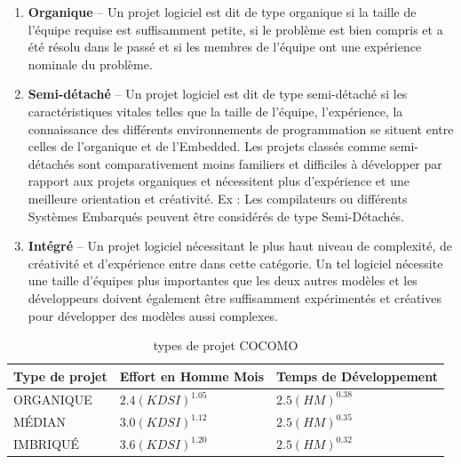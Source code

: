 \begin{enumerate}
	      \begin{enumerate}
		      \item \textbf{Organique} – Un projet logiciel est dit de type organique si la taille de l’équipe requise est suffisamment petite, si le problème est bien compris et a été résolu dans le passé et si les membres de l’équipe ont une expérience nominale du problème.
		      \item \textbf{Semi-détaché} – Un projet logiciel est dit de type semi-détaché si les caractéristiques vitales telles que la taille de l’équipe, l’expérience, la connaissance des différents environnements de programmation se situent entre celles de l’organique et de l’Embedded. Les projets classés comme semi-détachés sont comparativement moins familiers et difficiles à développer par rapport aux projets organiques et nécessitent plus d’expérience et une meilleure orientation et créativité. Ex : Les compilateurs ou différents Systèmes Embarqués peuvent être considérés de type Semi-Détachés.
		      \item \textbf{Intégré} – Un projet logiciel nécessitant le plus haut niveau de complexité, de créativité et d’expérience entre dans cette catégorie. Un tel logiciel nécessite une taille d’équipes plus importantes que les deux autres modèles et les développeurs doivent également être suffisamment expérimentés et créatives pour développer des modèles aussi complexes.
	      \end{enumerate}

	      \begin{table}[h!]
		      \caption {types de projet COCOMO}
		      \begin{tabularx}{\textwidth} {
				      | >{\raggedright\arraybackslash}X
				      | >{\centering\arraybackslash}X
				      | >{\raggedleft\arraybackslash}X |}
			      \hline
			      \textbf{Type de projet} & \textbf{Effort en Homme Mois} & \textbf{Temps de Développement} \\
			      \hline
			      ORGANIQUE              & $2.4(KDSI)^{1.05}$            & $2.5(HM)^{0.38}$                \\
			      \hline
			      MÉDIAN                  & $3.0(KDSI)^{1.12}$            & $2.5(HM)^{0.35}$                \\
			      \hline
			      IMBRIQUÉ                & $3.6(KDSI)^{1.20}$            & $2.5(HM)^{0.32}$                \\
			      \hline
		      \end{tabularx}
	      \end{table}


\end{enumerate}
